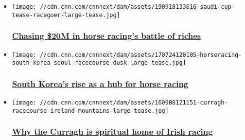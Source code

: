 \begin{itemize}
\item
  \href{/2019/09/18/sport/battle-to-be-the-richest-horse-race/index.html}{}

  \texttt{[image: //cdn.cnn.com/cnnnext/dam/assets/190918133616-saudi-cup-tease-racegoer-large-tease.jpg]}

  \hypertarget{chasing-20m-in-horse-racings-battle-of-riches}{%
  \subsubsection{\texorpdfstring{\href{/2019/09/18/sport/battle-to-be-the-richest-horse-race/index.html}{Chasing
  \$20M in horse racing's battle of
  riches}}{Chasing \$20M in horse racing's battle of riches}}\label{chasing-20m-in-horse-racings-battle-of-riches}}
\end{itemize}

\begin{itemize}
\item
  \href{/2019/08/28/sport/south-korea-horse-racing-seoul-winning-post-spt-intl/index.html}{}

  \texttt{[image: //cdn.cnn.com/cnnnext/dam/assets/170724120105-horseracing-south-korea-seoul-racecourse-dusk-large-tease.jpg]}

  \hypertarget{south-koreas-rise-as-a-hub-for-horse-racing}{%
  \subsubsection{\texorpdfstring{\href{/2019/08/28/sport/south-korea-horse-racing-seoul-winning-post-spt-intl/index.html}{South
  Korea's rise as a hub for horse
  racing}}{South Korea's rise as a hub for horse racing}}\label{south-koreas-rise-as-a-hub-for-horse-racing}}
\end{itemize}

\begin{itemize}
\item
  \href{/2019/09/13/sport/irish-horse-racing-longines-curragh-winning-post-spt-intl/index.html}{}

  \texttt{[image: //cdn.cnn.com/cnnnext/dam/assets/160908121151-curragh-racecourse-ireland-mountains-large-tease.jpg]}

  \hypertarget{why-the-curragh-is-spiritual-home-of-irish-racing-}{%
  \subsubsection{\texorpdfstring{\href{/2019/09/13/sport/irish-horse-racing-longines-curragh-winning-post-spt-intl/index.html}{Why
  the Curragh is spiritual home of Irish racing
  }}{Why the Curragh is spiritual home of Irish racing }}\label{why-the-curragh-is-spiritual-home-of-irish-racing-}}
\end{itemize}

